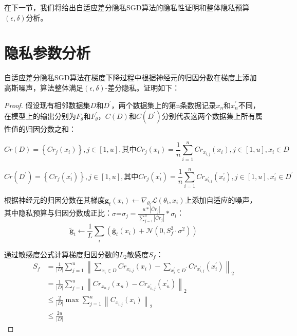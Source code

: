 在下一节，我们将给出自适应差分隐私SGD算法的隐私性证明和整体隐私预算$(\epsilon, \delta)$分析。

\section{隐私参数分析}

自适应差分隐私SGD算法在梯度下降过程中根据神经元的归因分数在梯度上添加高斯噪声，算法整体满足$(\epsilon, \delta)$-差分隐私。证明如下：

\begin{proof}
假设现有相邻数据集$D$和$D^{\prime}$，两个数据集上的第n条数据记录$x_{n}$和$x_{n}^{\prime}$不同，在模型上的输出分别为$F_{\theta}$和$F_{\theta}^{\prime}$，$C(D)$和$C(D^{\prime})$分别代表这两个数据集上所有属性值的归因分数之和：

\begin{equation}
Cr(D)=\left\{Cr_{j}\left(x_{i}\right)\right\}, j \in[1, u], \text {其中} Cr_{j}\left(x_{i}\right)=\frac{1}{n} \sum_{i=1}^{n} Cr_{x_{i, j}}\left(x_{i}\right), j \in[1, u], x_{i} \in D
\end{equation}

\begin{equation}
Cr\left(D^{\prime}\right)=\left\{Cr_{j}\left(x_{i}^{\prime}\right)\right\}, j \in[1, u], \text {其中} Cr_{j}\left(x_{i}^{\prime}\right)=\frac{1}{n} \sum_{i=1}^{n} Cr_{x_{i, j}^{\prime}}\left(x_{i}^{\prime}\right), j \in[1, u], x_{i}^{\prime} \in D^{\prime}
\end{equation}

根据神经元的归因分数在其梯度$\mathbf{g}_{t}\left(x_{i}\right) \leftarrow \nabla_{\theta_{t}} \mathcal{L}\left(\theta_{t}, x_{i}\right)$上添加自适应的噪声，其中隐私预算与归因分数成正比：$\sigma$=$\sigma_{j}=\frac{u *\left|\ddot{Cr}_{j}\right|}{\sum_{j=1}^{u}\left|\ddot{Cr}_{j}\right|} * \sigma_{l}$：
\begin{equation}\label{eq:神经网络加噪3}
\tilde{\mathbf{g}}_{t} \leftarrow \frac{1}{L} \sum_{i}\left(\overline{\mathbf{g}}_{t}\left(x_{i}\right)+\mathcal{N}\left(0, S_{f}^{2} \cdot \sigma^{2}\right)\right)
\end{equation}

通过敏感度公式计算梯度归因分数的$L_{2}$敏感度$S_{f}$：
\begin{equation}\label{eq:贡献敏感度}
\begin{aligned}
S_{f} &=\frac{1}{|D|} \sum_{j=1}^{u}\left\|\sum_{x_{i} \in D} Cr_{x_{i, j}}\left(x_{i}\right)-\sum_{x_{i}^{\prime} \in D^{\prime}} Cr_{x_{i, j}^{\prime}}\left(x_{i}^{\prime}\right)\right\|_{2} \\ &=\frac{1}{|D|} \sum_{j=1}^{u}\left\|Cr_{x_{n, j}}\left(x_{n}\right)-Cr_{x_{n, j}^{\prime}}\left(x_{n}^{\prime}\right)\right\|_{2} \\ & \leq \frac{2}{|D|} \max \sum_{j=1}^{u}\left\|C_{x_{i, j}}\left(x_{i}\right)\right\|_{2} \\ & \leq \frac{2 u}{|D|} 
\end{aligned}
\end{equation}


\end{proof}
